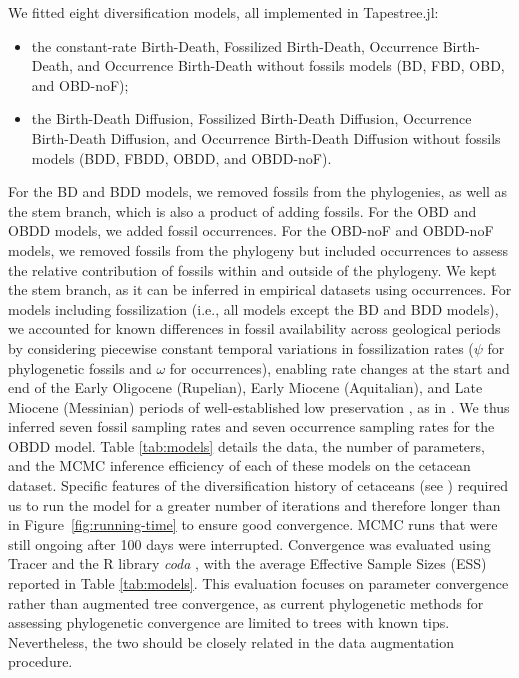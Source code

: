 \documentclass[oupdraft]{sysbio}
\begin{document}
We fitted eight diversification models, all implemented in Tapestree.jl:
\begin{itemize}
    \item the constant-rate Birth-Death, Fossilized Birth-Death, Occurrence Birth-Death, and Occurrence Birth-Death without fossils models (BD, FBD, OBD, and OBD-noF);
    \item the Birth-Death Diffusion, Fossilized Birth-Death Diffusion, Occurrence Birth-Death Diffusion, and Occurrence Birth-Death Diffusion without fossils models (BDD, FBDD, OBDD, and OBDD-noF).
\end{itemize}

For the BD and BDD models, we removed fossils from the phylogenies, as well as the stem branch, which is also a product of adding fossils. For the OBD and OBDD models, we added fossil occurrences. For the OBD-noF and OBDD-noF models, we removed fossils from the phylogeny but included occurrences to assess the relative contribution of fossils within and outside of the phylogeny. We kept the stem branch, as it can be inferred in empirical datasets using occurrences.
For models including fossilization (i.e., all models except the BD and BDD models), we accounted for known differences in fossil availability across geological periods by considering piecewise constant temporal variations in fossilization rates ($\psi$ for phylogenetic fossils and $\omega$ for occurrences), enabling rate changes at the start and end of the Early Oligocene (Rupelian), Early Miocene (Aquitalian), and Late Miocene (Messinian) periods of well-established low preservation \citep{marx_cetacean_2016, dominici_awkward_2020}, as in \citet{andreoletti_occurrence_2022}. We thus inferred seven fossil sampling rates and seven occurrence sampling rates for the OBDD model.
Table \ref{tab:models} details the data, the number of parameters, and the MCMC inference efficiency of each of these models on the cetacean dataset. Specific features of the diversification history of cetaceans (see ) required us to run the model for a greater number of iterations and therefore longer than in Figure~\ref{fig:running-time} to ensure good convergence. MCMC runs that were still ongoing after 100 days were interrupted. Convergence was evaluated using Tracer \citep{rambaut_posterior_2018} and the R library \textit{coda} \citep{plummer_coda_2006}, with the average Effective Sample Sizes (ESS) reported in Table \ref{tab:models}. This evaluation focuses on parameter convergence rather than augmented tree convergence, as current phylogenetic methods for assessing phylogenetic convergence are limited to trees with known tips. Nevertheless, the two should be closely related in the data augmentation procedure.
\end{document}
